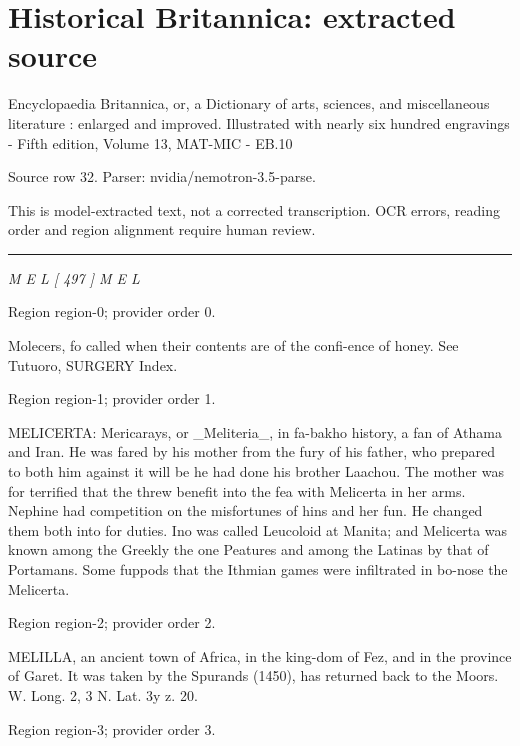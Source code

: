 \documentclass[11pt]{article}
\begin{document}
\section*{Historical Britannica: extracted source}
Encyclopaedia Britannica, or, a Dictionary of arts, sciences, and miscellaneous literature : enlarged and improved. Illustrated with nearly six hundred engravings - Fifth edition, Volume 13, MAT-MIC - EB.10\par
{\small Source row 32. Parser: nvidia/nemotron-3.5-parse.\par}
{\small This is model-extracted text, not a corrected transcription. OCR errors, reading order and region alignment require human review.\par}
\hrule\medskip
{\small\itshape M E L [ 497 ] M E L\par}

{\scriptsize\color{gray} Region region-0; provider order 0.\par}
\medskip

Molecers, fo called when their contents are of the confi-ence of honey. See Tutuoro, SURGERY Index.
\par

{\scriptsize\color{gray} Region region-1; provider order 1.\par}
\medskip

MELICERTA: Mericarays, or \_Meliteria\_, in fa-bakho history, a fan of Athama and Iran. He was fared by his mother from the fury of his father, who prepared to both him against it will be he had done his brother Laachou. The mother was for terrified that the threw benefit into the fea with Melicerta in her arms. Nephine had competition on the misfortunes of hins and her fun. He changed them both into for duties. Ino was called Leucoloid at Manita; and Melicerta was known among the Greekly the one Peatures and among the Latinas by that of Portamans. Some fuppods that the Ithmian games were infiltrated in bo-nose the Melicerta.
\par

{\scriptsize\color{gray} Region region-2; provider order 2.\par}
\medskip

MELILLA, an ancient town of Africa, in the king-dom of Fez, and in the province of Garet. It was taken by the Spurands (1450), has returned back to the Moors. W. Long. 2, 3 N. Lat. 3y z. 20.
\par

{\scriptsize\color{gray} Region region-3; provider order 3.\par}
\medskip
\end{document}
